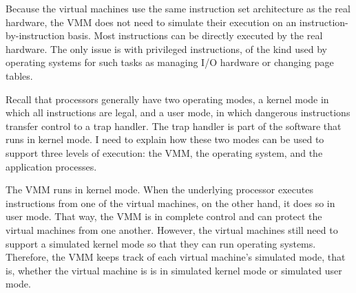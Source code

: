 Because the virtual machines use the same instruction set architecture
as the real hardware, the VMM does not need to simulate their
execution on an instruction-by-instruction basis.  Most instructions
can be directly executed by the real hardware.  The only issue is with
privileged instructions, of the kind used by operating systems for
such tasks as managing I/O hardware or changing page tables.

Recall that processors generally have two operating modes, a kernel
mode in which all instructions are legal, and a user mode, in which
dangerous instructions transfer control to a trap handler.
The trap handler is part of the software that runs in kernel mode.
I need
to explain how these two modes can be used to support three levels of
execution: the VMM, the operating system, and the application
processes.

The VMM runs in kernel mode.  When the underlying processor
executes instructions from one of the virtual machines, on the other
hand, it does so in user mode.  That way, the VMM is in complete
control and can protect the virtual machines from one another.
However, the virtual machines still need to support a simulated kernel
mode so that they can run operating systems.  Therefore, the VMM
keeps track of each virtual machine's simulated mode, that is, whether
the virtual machine is is in simulated kernel mode or simulated user
mode.

